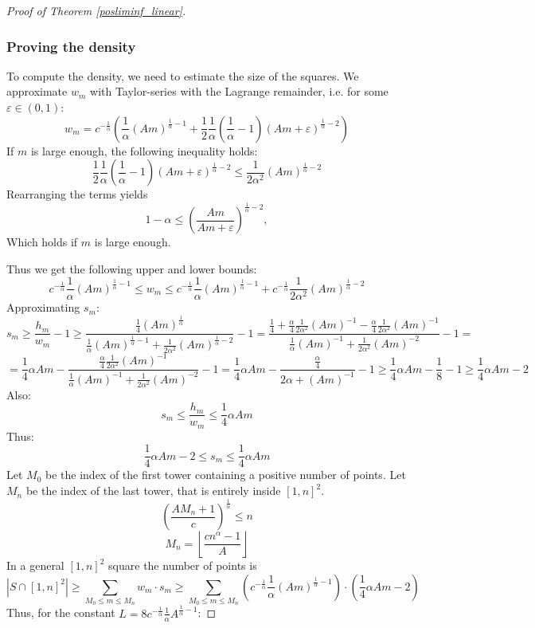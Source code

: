 \documentclass[11pt,a4paper]{article}
\numberwithin{equation}{section}
\begin{document}
\begin{proof}[Proof of Theorem \ref{posliminf_linear}]
    
    \subsubsection{Proving the density}

    To compute the density, we need to estimate the size of the squares.
    We approximate $w_m$ with Taylor-series with the Lagrange remainder, i.e. for some $\varepsilon\in(0, 1)$:
    $$
    w_m = c^{-\frac1\alpha}\left(\frac1\alpha (Am)^{\frac1\alpha -1}+ \frac12 \frac1\alpha \left(\frac{1}{\alpha }-1\right)(Am + \varepsilon)^{\frac1\alpha -2}\right)
    $$
    If $m$ is large enough, the following inequality holds:
    $$
    \frac12 \frac1\alpha \left(\frac{1}{\alpha }-1\right)(Am + \varepsilon)^{\frac{1}{\alpha}-2} \le \frac{1}{2\alpha^2}(Am)^{\frac{1}{\alpha}-2}
    $$
    Rearranging the terms yields
    $$
    1- \alpha \le \left(\frac{Am}{Am+\varepsilon}\right)^{\frac1\alpha - 2},
    $$
    Which holds if $m$ is large enough.


    
    Thus we get the following upper and lower bounds:
    $$
    c^{-\frac1\alpha}\frac1\alpha (Am)^{\frac1\alpha -1}\le w_m \le c^{-\frac1\alpha}\frac1\alpha (Am)^{\frac1\alpha -1} + c^{-\frac1\alpha}\frac{1}{2\alpha^2}(Am)^{\frac{1}{\alpha} -2 }
    $$
    Approximating $s_m$:
    $$
    s_m \ge \frac{h_m}{w_m} -1 \ge \frac{\frac{1}{4}(Am)^{\frac1\alpha}}{\frac1\alpha (Am)^{\frac1\alpha -1} + \frac{1}{2\alpha^2}(Am)^{\frac{1}{\alpha} -2 }}-1 =  \frac{\frac{1}{4} + \frac\alpha4 \frac{1}{2\alpha^2}(Am)^{ -1 } - \frac\alpha4 \frac{1}{2\alpha^2}(Am)^{-1 }}{\frac1\alpha (Am)^{ -1} + \frac{1}{2\alpha^2}(Am)^{-2 }}-1 =$$ 
    $$
    = \frac14 \alpha Am -\frac{ \frac\alpha4 \frac{1}{2\alpha^2}(Am)^{-1 }}{\frac1\alpha (Am)^{ -1} +  \frac{1}{2\alpha^2}(Am)^{-2 }}-1  = \frac14 \alpha Am -\frac{\frac\alpha4}{2\alpha  + (Am)^{-1}}-1\ge 
    \frac14 \alpha Am - \frac{1}{8} -1 
    \ge 
    \frac14\alpha Am-2$$
    Also:
    $$
    s_m\le \frac{h_m}{w_m}\le \frac14\alpha Am
    $$
    Thus:
    $$
    \frac14 \alpha Am - 2\le s_m\le \frac14 \alpha Am
    $$   
    Let $M_0$ be the index of the first tower containing a positive number of points. Let $M_n$ be the index of the last tower, that is entirely inside $[1, n]^2$. 
    $$
    \left(\frac{AM_n + 1}{c}\right)^\frac{1}{\alpha} \le n
    $$
    $$
    M_n = \left \lfloor\frac{cn^\alpha - 1}{A}\right \rfloor
    $$   
    In a general $[1,n]^2$ square the number of points is
    $$
    |S \cap [1,n]^2| 
    \ge \sum_{M_0\le m\le M_n} w_m \cdot s_m
    \ge \sum_{M_0\le m \le M_n} \left(c^{-\frac1\alpha}\frac1\alpha (Am)^{\frac1\alpha -1}\right) \cdot \left(\frac14 \alpha Am - 2\right)
    $$
    Thus, for the constant $L = 8c^{-\frac1\alpha} \frac1\alpha A^{\frac1\alpha -1}$:
    

\end{proof}
\end{document}
